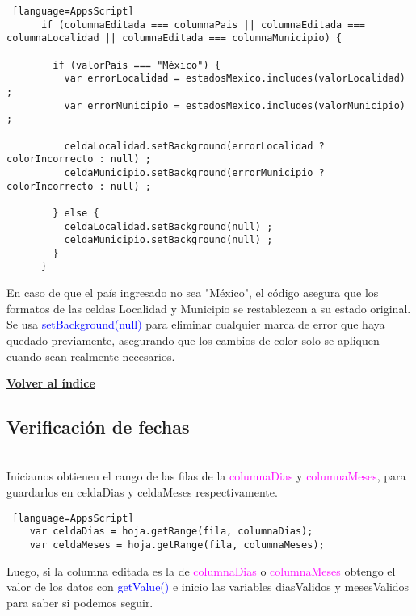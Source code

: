 \documentclass[12pt]{article} %
\begin{document}
    \begin{lstlisting} [language=AppsScript]
      if (columnaEditada === columnaPais || columnaEditada === columnaLocalidad || columnaEditada === columnaMunicipio) {

        if (valorPais === "México") {
          var errorLocalidad = estadosMexico.includes(valorLocalidad) ;
          var errorMunicipio = estadosMexico.includes(valorMunicipio) ;
    
          celdaLocalidad.setBackground(errorLocalidad ? colorIncorrecto : null) ;
          celdaMunicipio.setBackground(errorMunicipio ? colorIncorrecto : null) ;
          
        } else {
          celdaLocalidad.setBackground(null) ;
          celdaMunicipio.setBackground(null) ;
        }
      }
      \end{lstlisting}
    
    En caso de que el país ingresado no sea "México", el código asegura que los formatos de las celdas Localidad y Municipio se restablezcan a su estado original. Se usa \textcolor{blue}{setBackground(null)} para eliminar cualquier marca de error que haya quedado previamente, asegurando que los cambios de color solo se apliquen cuando sean realmente necesarios.


            \begin{flushright}
                \hyperlink{toc}{\textbf{Volver al índice}}
            \end{flushright}



    
    \subsection*{Verificación de fechas}
    \\

    Iniciamos obtienen el rango de las filas de la \textcolor{magenta}{columnaDias} y \textcolor{magenta}{columnaMeses}, para guardarlos en celdaDias y celdaMeses respectivamente. \\

    \begin{lstlisting} [language=AppsScript]
    var celdaDias = hoja.getRange(fila, columnaDias);
    var celdaMeses = hoja.getRange(fila, columnaMeses);
    \end{lstlisting}

    Luego, si la columna editada es la de \textcolor{magenta}{columnaDias} o \textcolor{magenta}{columnaMeses} obtengo el valor de los datos con \textcolor{blue}{getValue()} e inicio las variables diasValidos y mesesValidos para saber si podemos seguir.  \\
\end{document}

